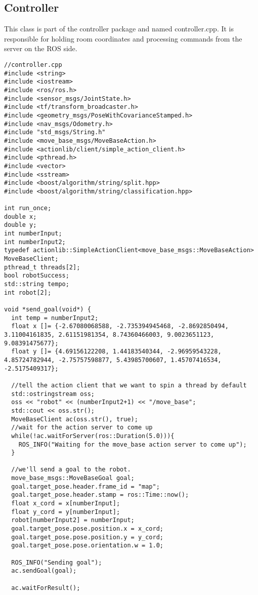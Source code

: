 \subsection{Controller} 
This class is part of the controller package and named controller.cpp. It is responsible for holding room coordinates and processing commands from the server on the ROS side.
\begin{lstlisting}
//controller.cpp
#include <string>
#include <iostream>
#include <ros/ros.h>
#include <sensor_msgs/JointState.h>
#include <tf/transform_broadcaster.h>
#include <geometry_msgs/PoseWithCovarianceStamped.h>
#include <nav_msgs/Odometry.h>
#include "std_msgs/String.h"
#include <move_base_msgs/MoveBaseAction.h>
#include <actionlib/client/simple_action_client.h>
#include <pthread.h>
#include <vector>
#include <sstream>
#include <boost/algorithm/string/split.hpp>
#include <boost/algorithm/string/classification.hpp>

int run_once;
double x;
double y;
int numberInput;
int numberInput2;
typedef actionlib::SimpleActionClient<move_base_msgs::MoveBaseAction> MoveBaseClient;
pthread_t threads[2];
bool robotSuccess;
std::string tempo;
int robot[2];

void *send_goal(void*) {
  int temp = numberInput2;
  float x []= {-2.67080068588, -2.735394945468, -2.8692850494, 3.11004161835, 2.61151981354, 8.74360466003, 9.0023651123, 9.08391475677};
  float y []= {4.69156122208, 1.44183540344, -2.96959543228, 4.85724782944, -2.75757598877, 5.43985700607, 1.45707416534, -2.5175409317};
  
  //tell the action client that we want to spin a thread by default
  std::ostringstream oss;
  oss << "robot" << (numberInput2+1) << "/move_base";
  std::cout << oss.str();
  MoveBaseClient ac(oss.str(), true);
  //wait for the action server to come up
  while(!ac.waitForServer(ros::Duration(5.0))){
    ROS_INFO("Waiting for the move_base action server to come up");
  }

  //we'll send a goal to the robot.
  move_base_msgs::MoveBaseGoal goal;
  goal.target_pose.header.frame_id = "map";
  goal.target_pose.header.stamp = ros::Time::now();
  float x_cord = x[numberInput];
  float y_cord = y[numberInput];
  robot[numberInput2] = numberInput;
  goal.target_pose.pose.position.x = x_cord;
  goal.target_pose.pose.position.y = y_cord;
  goal.target_pose.pose.orientation.w = 1.0;

  ROS_INFO("Sending goal");
  ac.sendGoal(goal);

  ac.waitForResult();


\end{lstlisting}
